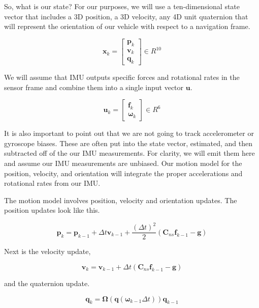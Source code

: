 So, what is our state? For our purposes, we will use a ten-dimensional
state vector that includes a 3D position, a 3D velocity, any 4D unit
quaternion that will represent the orientation of our vehicle with respect to a navigation frame. 

\begin{equation}
\mathbf{x}_k = 
\begin{bmatrix}
\mathbf{p}_k \\
\mathbf{v}_k \\
\mathbf{q}_k 
\end{bmatrix} \in R^{10}
\end{equation}


We will assume that IMU outputs specific forces and rotational rates in the sensor frame and combine them into a single
input vector $\mathbf{u}$. 

\begin{equation}
\mathbf{u}_k =
\begin{bmatrix}
\mathbf{f}_k \\
\boldsymbol{\omega}_k
\end{bmatrix} \in R^6
\end{equation}

It is also important to point out that we are not going to track accelerometer
or gyroscope biases. These are often put into the state vector, estimated, and then subtracted off of the our IMU
measurements. For clarity, we will emit them here and assume our IMU measurements
are unbiased. Our motion model for the position, velocity, and orientation
will integrate the proper accelerations and rotational rates
from our IMU. 

The motion model involves position, velocity and orientation updates. The position updates look like this. 

\begin{equation}
\mathbf{p}_k = \mathbf{p}_{k-1} + \Delta t \mathbf{v}_{k-1} + \frac{(\Delta t)^2}{2}(\mathbf{C}_{ns}\mathbf{f}_{k-1} - \mathbf{g}) 
\end{equation}

Next is the velocity update,


\begin{equation}
\mathbf{v}_k = \mathbf{v}_{k-1} + \Delta t (\mathbf{C}_{ns}\mathbf{f}_{k-1} - \mathbf{g}) 
\end{equation}

and the quaternion update. 

\begin{equation}
\mathbf{q}_k = \boldsymbol{\Omega} (\mathbf{q}(\boldsymbol{\omega}_{k-1} \Delta t))\mathbf{q}_{k-1} 
\end{equation}

